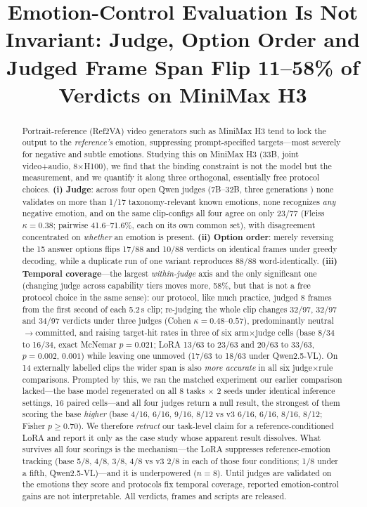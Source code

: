 \documentclass[conference]{IEEEtran}
\title{Emotion-Control Evaluation Is Not Invariant: Judge, Option Order and
Judged Frame Span Flip 11--58\% of Verdicts on MiniMax H3}
\author{\IEEEauthorblockN{Anonymous}}
\begin{document}
\maketitle

\begin{abstract}
Portrait-reference (Ref2VA) video generators such as MiniMax H3 tend to lock the output to the
\emph{reference's} emotion, suppressing prompt-specified targets---most severely for negative and
subtle emotions. Studying this on MiniMax H3 (33B, joint video+audio, 8$\times$H100), we find that the
binding constraint is not the model but the measurement, and we quantify it along three orthogonal,
essentially free protocol choices. \textbf{(i) Judge}: across four open Qwen judges
(7B--32B, three generations \cite{qwen25vl2025,qwen3vl2025,qwen3827}) none validates on more than 1/17
taxonomy-relevant known emotions, none recognizes \emph{any} negative emotion, and on the same
clip-configs all four agree on only 23/77 (Fleiss $\kappa{=}0.38$; pairwise 41.6--71.6\%, each on its own common set), with
disagreement concentrated on \emph{whether} an emotion is present. \textbf{(ii) Option order}: merely
reversing the 15 answer options flips 17/88 and 10/88 verdicts on identical frames under greedy
decoding, while a duplicate run of one variant reproduces 88/88 word-identically. \textbf{(iii) Temporal coverage}---the largest \emph{within-judge}
axis and the only significant one (changing judge across capability tiers moves more, 58\%, but that is
not a free protocol choice in the same sense): our protocol, like much practice, judged 8 frames from the first second of each
5.2\,s clip; re-judging the whole clip changes 32/97, 32/97 and 34/97 verdicts under three judges (Cohen
$\kappa{=}0.48$--$0.57$), predominantly neutral$\rightarrow$committed, and raising target-hit rates in
three of six arm$\times$judge cells (base 8/34 to 16/34, exact McNemar $p{=}0.021$; LoRA 13/63 to 23/63
and 20/63 to 33/63, $p{=}0.002$, $0.001$) while leaving one unmoved (17/63 to 18/63 under
Qwen2.5-VL). On 14 externally labelled clips the wider span is also \emph{more accurate} in all six
judge$\times$rule comparisons. Prompted by this, we ran the matched experiment our earlier
comparison lacked---the base model regenerated on all 8 tasks $\times$ 2 seeds under identical inference
settings, 16 paired cells---and all four judges return a null result, the strongest of them scoring the
base \emph{higher} (base 4/16, 6/16, 9/16, 8/12 vs v3 6/16, 6/16, 8/16, 8/12; Fisher $p{\ge}0.70$). We therefore
\emph{retract} our task-level claim for a reference-conditioned LoRA and report it only as the case study
whose apparent result dissolves. What survives all four scorings is the mechanism---the LoRA suppresses
reference-emotion tracking (base 5/8, 4/8, 3/8, 4/8 vs v3 2/8 in each of those four conditions; 1/8 under a fifth,
Qwen2.5-VL)---and it is underpowered
($n{=}8$). Until judges are validated on the emotions they score and protocols fix temporal coverage,
reported emotion-control gains are not interpretable. All verdicts, frames and scripts are released.
\end{abstract}
\end{document}
